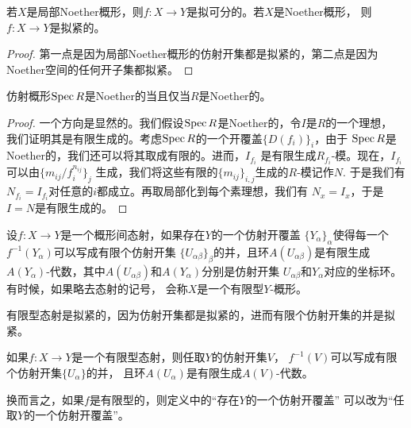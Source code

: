 \begin{pro}
	若$X$是局部Noether概形，则$f:X\to Y$是拟可分的。若$X$是Noether概形，
	则$f:X\to Y$是拟紧的。
\end{pro}

\begin{proof}
	第一点是因为局部Noether概形的仿射开集都是拟紧的，第二点是因为
	Noether空间的任何开子集都拟紧。
\end{proof}

\begin{pro}
	仿射概形$\operatorname{Spec} R$是Noether的当且仅当$R$是Noether的。
\end{pro}

\begin{proof}
一个方向是显然的。我们假设$\operatorname{Spec} R$是Noether的，令$I$是$R$的一个理想，
我们证明其是有限生成的。考虑$\operatorname{Spec} R$的一个开覆盖$\{D(f_i)\}_i$，由于
$\operatorname{Spec} R$是Noether的，我们还可以将其取成有限的。进而，$I_{f_i}$
是有限生成$R_{f_i}$-模。现在，$I_{f_i}$可以由$\{m_{ij}/f_i^{n_{ij}}\}_j$
生成，我们将这些有限的$\{m_{ij}\}_{i,j}$生成的$R$-模记作$N$. 于是我们有
$N_{f_i}=I_{f_i}$对任意的$i$都成立。再取局部化到每个素理想，我们有
$N_{x}=I_x$，于是$I=N$是有限生成的。
\end{proof}



\begin{para}[有限型态射]
设$f:X\to Y$是一个概形间态射，如果存在$Y$的一个仿射开覆盖
$\{Y_\alpha\}_\alpha$使得每一个$f^{-1}(Y_\alpha)$可以写成有限个仿射开集
$\{U_{\alpha\beta}\}_\beta$的并，且环$A(U_{\alpha\beta})$是有限生成
$A(Y_\alpha)$-代数，其中$A(U_{\alpha\beta})$和$A(Y_\alpha)$分别是仿射开集
$U_{\alpha\beta}$和$Y_\alpha$对应的坐标环。有时候，如果略去态射的记号，
会称$X$是一个有限型$Y$-概形。
\end{para}

有限型态射是拟紧的，因为仿射开集都是拟紧的，进而有限个仿射开集的并是拟紧。

\begin{pro}
	如果$f:X\to Y$是一个有限型态射，则任取$Y$的仿射开集$V$，
	$f^{-1}(V)$可以写成有限个仿射开集$\{U_{\alpha}\}$的并，
	且环$A(U_{\alpha})$是有限生成$A(V)$-代数。
\end{pro}

换而言之，如果$f$是有限型的，则定义中的“存在$Y$的一个仿射开覆盖”
可以改为“任取$Y$的一个仿射开覆盖”。

